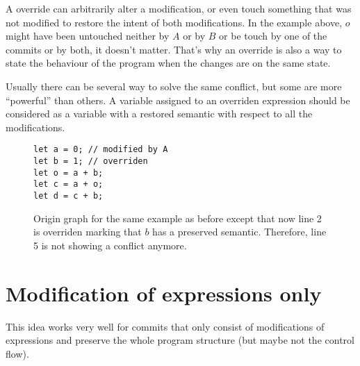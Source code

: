 \documentclass[a4paper,10pt]{article}
\begin{document}
A override can arbitrarily alter a modification, or even touch something that was not modified to restore the intent of both modifications. In the example above, $o$ might have been untouched neither by $A$ or by $B$ or be touch by one of the commits or by both, it doesn't matter. That's why an override is also a way to state the behaviour of the program when the changes are on the same state.

Usually there can be several way to solve the same conflict, but some are more ``powerful'' than others. A variable assigned to an overriden expression should be considered as a variable with a restored semantic with respect to all the modifications.

\begin{figure}[ht]
\begin{minipage}{.5\textwidth}
\begin{lstlisting}
let a = 0; // modified by A
let b = 1; // overriden
let o = a + b;
let c = a + o;
let d = c + b;
\end{lstlisting}
\end{minipage}\hfill
\begin{minipage}{.45\textwidth}
\centering{}
\end{minipage}
\caption{Origin graph for the same example as before except that now line 2 is
overriden marking that $b$ has a preserved semantic. Therefore, line 5 is not showing a conflict anymore.}
\end{figure}

\section{Modification of expressions only}
This idea works very well for commits that only consist of modifications of expressions and preserve the whole program structure (but maybe not the control flow).
\end{document}
